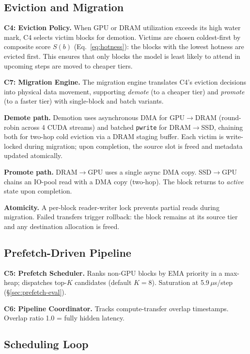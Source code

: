 \documentclass[conference]{IEEEtran}
\begin{document}
\subsection{Eviction and Migration}
\label{sec:migration}

\textbf{C4: Eviction Policy.} When GPU or DRAM utilization exceeds its high water mark, C4 selects victim blocks for demotion. Victims are chosen coldest-first by composite score $S(b)$ (Eq.~\ref{eq:hotness}): the blocks with the lowest hotness are evicted first. This ensures that only blocks the model is least likely to attend in upcoming steps are moved to cheaper tiers.

\textbf{C7: Migration Engine.} The migration engine translates C4's eviction decisions into physical data movement, supporting \emph{demote} (to a cheaper tier) and \emph{promote} (to a faster tier) with single-block and batch variants.

\textbf{Demote path.} Demotion uses asynchronous DMA for GPU$\to$DRAM (round-robin across 4 CUDA streams) and batched \texttt{pwrite} for DRAM$\to$SSD, chaining both for two-hop cold eviction via a DRAM staging buffer. Each victim is write-locked during migration; upon completion, the source slot is freed and metadata updated atomically.

\textbf{Promote path.} DRAM$\to$GPU uses a single async DMA copy. SSD$\to$GPU chains an IO-pool read with a DMA copy (two-hop). The block returns to \emph{active} state upon completion.

\textbf{Atomicity.} A per-block reader-writer lock prevents partial reads during migration. Failed transfers trigger rollback: the block remains at its source tier and any destination allocation is freed.

\subsection{Prefetch-Driven Pipeline}
\label{sec:pipeline}


\textbf{C5: Prefetch Scheduler.} Ranks non-GPU blocks by EMA priority in a max-heap; dispatches top-$K$ candidates (default $K{=}8$). Saturation at 5.9\,$\mu$s/step (\S\ref{sec:prefetch-eval}).

\textbf{C6: Pipeline Coordinator.} Tracks compute-transfer overlap timestamps. Overlap ratio 1.0 = fully hidden latency.

\subsection{Scheduling Loop}
\label{sec:sched-loop}
\end{document}

